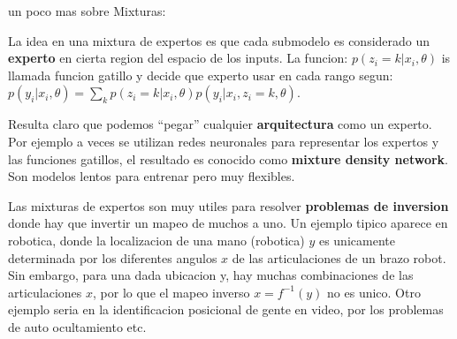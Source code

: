 \documentclass[ignorenonframetext,]{beamer}
\begin{document}
\begin{frame}

\begin{block}{un poco mas sobre Mixturas:}

La idea en una mixtura de expertos es que cada submodelo es considerado
un \textbf{experto} en cierta region del espacio de los inputs. La
funcion: \(p(z_{i} = k|x_{i}, \theta)\) is llamada funcion gatillo y
decide que experto usar en cada rango segun:
\(p(y_{i}|x_{i}, \theta)=\sum_{k} p(z_{i}=k|x_{i}, \theta) p(y_{i}|x_{i}, z_{i}=k, \theta)\).

Resulta claro que podemos ``pegar'' cualquier \textbf{arquitectura} como
un experto. Por ejemplo a veces se utilizan redes neuronales para
representar los expertos y las funciones gatillos, el resultado es
conocido como \textbf{mixture density network}. Son modelos lentos para
entrenar pero muy flexibles.

Las mixturas de expertos son muy utiles para resolver \textbf{problemas
de inversion} donde hay que invertir un mapeo de muchos a uno. Un
ejemplo tipico aparece en robotica, donde la localizacion de una mano
(robotica) \(y\) es unicamente determinada por los diferentes angulos
\(x\) de las articulaciones de un brazo robot. Sin embargo, para una
dada ubicacion y, hay muchas combinaciones de las articulaciones \(x\),
por lo que el mapeo inverso \(x = f^{-1}(y)\) no es unico. Otro ejemplo
seria en la identificacion posicional de gente en video, por los
problemas de auto ocultamiento etc.

\end{block}

\end{frame}
\end{document}
